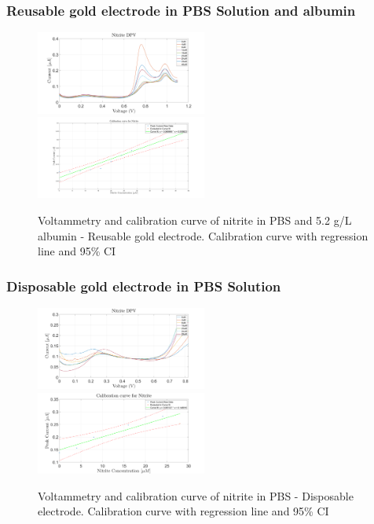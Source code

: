 \subsubsection{Reusable gold electrode in PBS Solution and albumin}
\begin{figure}[H]
    \centering
    \includegraphics[width = 0.5\textwidth]{img/albumin reus.png}
    \includegraphics[width = 0.5\textwidth]{img/albumin reus calibration.png}
    \caption{Voltammetry and calibration curve of nitrite in PBS and 5.2 g/L albumin - Reusable gold electrode. Calibration curve with regression line and 95\% CI} 
    \label{fig:nitrite_result_2}
\end{figure}

\subsubsection{Disposable gold electrode in PBS Solution}
\begin{figure}[H]
    \centering
    \includegraphics[width = 0.5\textwidth]{img/disp clean.png}
    \includegraphics[width = 0.5\textwidth]{img/disp clean calibration.png}
    \caption{Voltammetry and calibration curve of nitrite in PBS - Disposable electrode. Calibration curve with regression line and 95\% CI}
    \label{fig:nitrite_result_3}
\end{figure}


